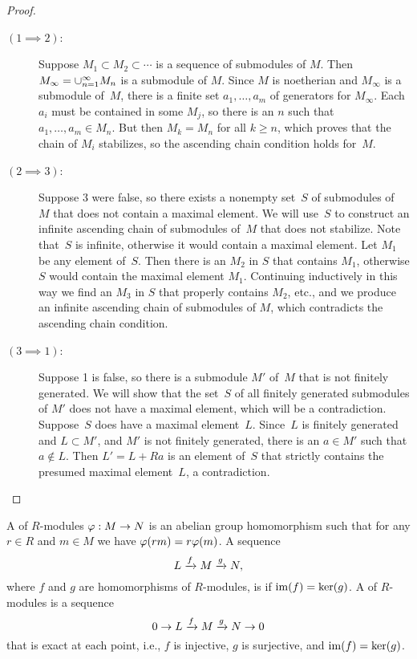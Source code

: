\begin{proof}
	\hfill
	\begin{description}
		\item[$(1\implies 2)$:]
			Suppose $M_1\subset M_2\subset \cdots$ is a
			sequence of submodules of $M$.  Then
			$M_\infty=\cup_{n=1}^{\infty} M_n$ is a submodule of $M$.
			Since $M$ is noetherian and $M_\infty$ is a submodule of~$M$,
			there is a finite set $a_1,\ldots, a_m$ of 
			generators for $M_{\infty}$.  Each $a_i$
			must be contained in some $M_j$, so there is an $n$ such that
			$a_1,\ldots, a_m\in M_n$.  But then $M_{k}=M_n$ for all
			$k\geq n$, which proves that the chain of $M_i$ stabilizes,
			so the ascending chain condition holds for~$M$.
		
		\item[$(2\implies 3)$:]
			Suppose 3 were false, so there exists
			a nonempty set~$S$ of submodules of~$M$ that does not
			contain a maximal element.  We will use~$S$ to construct
			an infinite ascending chain of submodules of~$M$ that
			does not stabilize. Note that~$S$ is infinite, otherwise
			it would contain a maximal element.  Let $M_1$ be
			any element of~$S$.  Then there is an $M_2$ in $S$ that
			contains $M_1$, otherwise $S$ would contain the maximal
			element $M_1$. Continuing inductively in this way we find
			an $M_3$ in $S$ that properly contains $M_2$, etc., and we
			produce an infinite ascending chain of submodules of $M$,
			which contradicts the ascending chain condition.
		
		\item[$(3\implies 1)$:]
			Suppose 1 is false, so there is a submodule $M'$ of~$M$ that
			is not finitely generated.  We will show that the set~$S$ of
			all finitely generated submodules of $M'$ does not
			have a maximal element, which will be a contradiction.
			Suppose~$S$ does have a maximal element~$L$.  Since~$L$
			is finitely generated and $L\subset M'$, and $M'$ is not
			finitely generated, there is an $a\in M'$ such that
			$a\not\in L$.  Then $L'=L+Ra$ is an element of~$S$ that
			strictly contains the presumed maximal element~$L$,
			a contradiction.
	\end{description}
\end{proof}

\begin{definition}
	A  of $R$-modules $\varphi:M\to N$ is an abelian
	group homomorphism such that for any $r\in R$ and $m\in M$ we have
	$\varphi(rm) = r\varphi(m)$. A sequence
	$$
		L \xrightarrow{f} M \xrightarrow{g} N,
	$$
	where $f$ and $g$ are homomorphisms of $R$-modules, is 
	if $\operatorname{im}(f)=\ker(g)$. A  of $R$-modules
	is a sequence
	$$
		0 \to L \xrightarrow{f} M \xrightarrow{g} N \to 0
	$$
	that is exact at each point, i.e., $f$ is injective, $g$ is surjective,
	and $\operatorname{im}(f) = \ker(g)$.
\end{definition}

